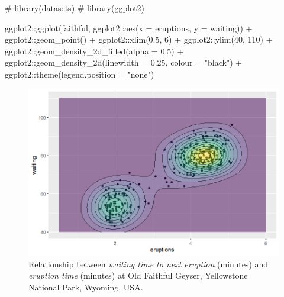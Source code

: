 \documentclass[
12pt,
openright,
oneside,
a4paper,
chapter=TITLE,
section=TITLE,
french,
spanish,
brazil,
english
]{abntex2}\usepackage{array}
\newenvironment{Shaded}{\begin{snugshade}}{\end{snugshade}}
\newcommand{\AttributeTok}[1]{\textcolor[rgb]{0.40,0.45,0.13}{#1}}
\newcommand{\CommentTok}[1]{\textcolor[rgb]{0.37,0.37,0.37}{#1}}
\newcommand{\DecValTok}[1]{\textcolor[rgb]{0.68,0.00,0.00}{#1}}
\newcommand{\FloatTok}[1]{\textcolor[rgb]{0.68,0.00,0.00}{#1}}
\newcommand{\FunctionTok}[1]{\textcolor[rgb]{0.28,0.35,0.67}{#1}}
\newcommand{\NormalTok}[1]{\textcolor[rgb]{0.00,0.23,0.31}{#1}}
\newcommand{\SpecialCharTok}[1]{\textcolor[rgb]{0.37,0.37,0.37}{#1}}
\newcommand{\StringTok}[1]{\textcolor[rgb]{0.13,0.47,0.30}{#1}}
\begin{document}
\begin{Shaded}
\begin{Highlighting}[numbers=left,,]
\CommentTok{\# library(datasets)}
\CommentTok{\# library(ggplot2)}

\NormalTok{ggplot2}\SpecialCharTok{::}\FunctionTok{ggplot}\NormalTok{(faithful, ggplot2}\SpecialCharTok{::}\FunctionTok{aes}\NormalTok{(}\AttributeTok{x =}\NormalTok{ eruptions, }\AttributeTok{y =}\NormalTok{ waiting)) }\SpecialCharTok{+}
\NormalTok{  ggplot2}\SpecialCharTok{::}\FunctionTok{geom\_point}\NormalTok{() }\SpecialCharTok{+}
\NormalTok{  ggplot2}\SpecialCharTok{::}\FunctionTok{xlim}\NormalTok{(}\FloatTok{0.5}\NormalTok{, }\DecValTok{6}\NormalTok{) }\SpecialCharTok{+}
\NormalTok{  ggplot2}\SpecialCharTok{::}\FunctionTok{ylim}\NormalTok{(}\DecValTok{40}\NormalTok{, }\DecValTok{110}\NormalTok{) }\SpecialCharTok{+}
\NormalTok{  ggplot2}\SpecialCharTok{::}\FunctionTok{geom\_density\_2d\_filled}\NormalTok{(}\AttributeTok{alpha =} \FloatTok{0.5}\NormalTok{) }\SpecialCharTok{+}
\NormalTok{  ggplot2}\SpecialCharTok{::}\FunctionTok{geom\_density\_2d}\NormalTok{(}\AttributeTok{linewidth =} \FloatTok{0.25}\NormalTok{, }\AttributeTok{colour =} \StringTok{"black"}\NormalTok{) }\SpecialCharTok{+}
\NormalTok{  ggplot2}\SpecialCharTok{::}\FunctionTok{theme}\NormalTok{(}\AttributeTok{legend.position =} \StringTok{"none"}\NormalTok{)}
\end{Highlighting}
\end{Shaded}

\begin{figure}[H]

\caption{\label{fig-eruption}Relationship between \emph{waiting time to
next eruption} (minutes) and \emph{eruption time} (minutes) at Old
Faithful Geyser, Yellowstone National Park, Wyoming, USA.}

{\centering \includegraphics{index_files/figure-pdf/fig-eruption-1.png}

}

\end{figure}
\end{document}
